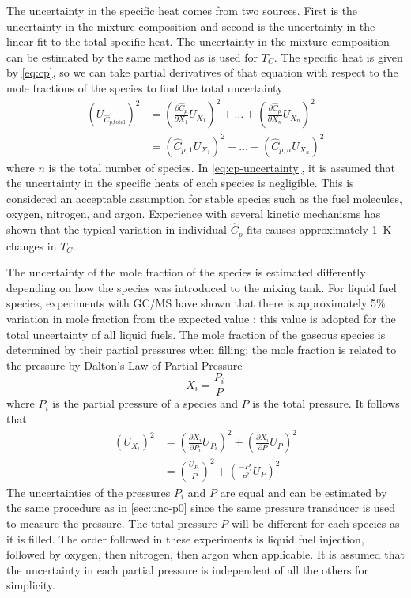 \documentclass[../main.tex]{subfiles}
\begin{document}
The uncertainty in the specific heat comes from two sources. First is the
uncertainty in the mixture composition and second is the uncertainty in
the linear fit to the total specific heat. The uncertainty in the mixture
composition can be estimated by the same method as is used for $T_C$. The
specific heat is given by \cref{eq:cp}, so we can take partial derivatives
of that equation with respect to the mole fractions of the species to find
the total uncertainty
%
\begin{equation}
\label{eq:cp-uncertainty}
\begin{split}
\left(U_{\hat{C}_{p\text{,total}}}\right)^2 &= \left(\frac{\partial \hat{C}_p}{\partial X_1} U_{X_1}\right)^2 + \ldots + \left(\frac{\partial \hat{C}_p}{\partial X_n} U_{X_n}\right)^2 \\
&= \left(\hat{C}_{p,1} U_{X_1}\right)^2 + \ldots + \left(\hat{C}_{p,n} U_{X_n}\right)^2
\end{split}
\end{equation}
%
where $n$ is the total number of species. In \cref{eq:cp-uncertainty},
it is assumed that the uncertainty in the specific heats of each species
is negligible. This is considered an acceptable assumption for stable species
such as the fuel molecules, oxygen, nitrogen, and argon. Experience with
several kinetic mechanisms has shown that the typical variation in individual
$\hat{C}_p$ fits causes approximately \SI{1}{\kelvin} changes in $T_C$.

The uncertainty of the mole fraction of the species is estimated differently
depending on how the species was introduced to the mixing tank. For liquid fuel
species, experiments with GC/MS have shown that there is approximately 5\%
variation in mole fraction from the expected value \cite{Weber2011}; this value is adopted for
the total uncertainty of all liquid fuels. The mole fraction of the gaseous species
is determined by their partial pressures when filling; the mole fraction is
related to the pressure by Dalton's Law of Partial Pressure
\cite{Dalton1801,Gillespie1930}
%
\begin{equation}
X_i = \frac{P_i}{P}
\end{equation}
%
where $P_i$ is the partial pressure of a species and $P$ is the total pressure.
It follows that
%
\begin{equation}
\begin{split}
\left(U_{X_i}\right)^2 &= \left(\frac{\partial X_i}{\partial P_i} U_{P_i}\right)^2 + \left(\frac{\partial X_i}{\partial P} U_P\right)^2 \\
&= \left(\frac{U_{P_i}}{P}\right)^2 + \left(\frac{{-P_i}}{P^2} U_P\right)^2
\end{split}
\end{equation}
%
The uncertainties of the pressures $P_i$ and $P$ are equal and can be estimated by
the same procedure as in \cref{sec:unc-p0} since the same pressure transducer
is used to measure the pressure. The total pressure $P$ will be different for
each species as it is filled. The order followed in these experiments is
liquid fuel injection, followed by oxygen, then nitrogen, then argon when
applicable. It is assumed that the uncertainty in each partial pressure
is independent of all the others for simplicity.
\end{document}
